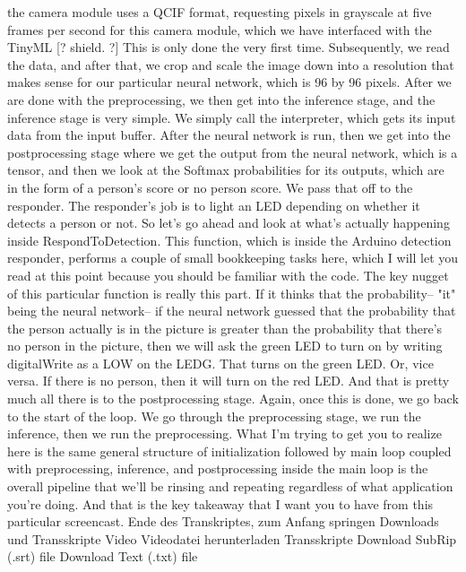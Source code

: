     the camera module uses a QCIF format, requesting pixels in grayscale
    at five frames per second for this camera module, which
    we have interfaced with the TinyML [? shield. ?]
    This is only done the very first time.
    Subsequently, we read the data, and after that, we
    crop and scale the image down into a resolution that
    makes sense for our particular neural network, which is 96 by 96 pixels.
    After we are done with the preprocessing,
    we then get into the inference stage, and the inference stage is very simple.
    We simply call the interpreter, which gets its input data from the input
    buffer.
    After the neural network is run, then we get into the postprocessing stage
    where we get the output from the neural network, which is a tensor,
    and then we look at the Softmax probabilities
    for its outputs, which are in the form of a person's score or no person score.
    We pass that off to the responder.
    The responder's job is to light an LED depending on
    whether it detects a person or not.
    So let's go ahead and look at what's actually
    happening inside RespondToDetection.
    This function, which is inside the Arduino detection responder,
    performs a couple of small bookkeeping tasks
    here, which I will let you read at this point
    because you should be familiar with the code.
    The key nugget of this particular function is really this part.
    If it thinks that the probability--
    "it" being the neural network-- if the neural network guessed
    that the probability that the person actually is in the picture
    is greater than the probability that there's no person in the picture,
    then we will ask the green LED to turn on by writing digitalWrite
    as a LOW on the LEDG.
    That turns on the green LED.
    Or, vice versa.
    If there is no person, then it will turn on the red LED.
    And that is pretty much all there is to the postprocessing stage.
    Again, once this is done, we go back to the start of the loop.
    We go through the preprocessing stage, we run the inference,
    then we run the preprocessing.
    What I'm trying to get you to realize here
    is the same general structure of initialization followed
    by main loop coupled with preprocessing, inference,
    and postprocessing inside the main loop is the overall pipeline
    that we'll be rinsing and repeating regardless
    of what application you're doing.
    And that is the key takeaway that I want you to have
    from this particular screencast.
    Ende des Transkriptes, zum Anfang springen
    Downloads und Transskripte
    Video
    Videodatei herunterladen
    Transskripte
    Download SubRip (.srt) file
    Download Text (.txt) file    
    
